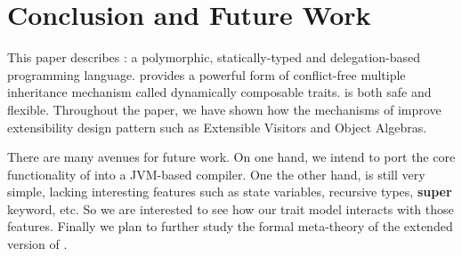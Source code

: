 \section{Conclusion and Future Work}

This paper describes \name: a polymorphic, statically-typed and delegation-based
programming language. \name provides a powerful form of conflict-free multiple
inheritance mechanism called dynamically composable traits. \name is both safe
and flexible. Throughout the paper, we have shown how the mechanisms of \name
improve extensibility design pattern such as Extensible Visitors and Object
Algebras.

There are many avenues for future work. On one hand, we intend to port the core
functionality of \name into a JVM-based compiler. One the other hand, \name is
still very simple, lacking interesting features such as state variables,
recursive types, \textbf{super} keyword, etc. So we are interested to see how
our trait model interacts with those features. Finally we plan to further study
the formal meta-theory of the extended version of \bname.
